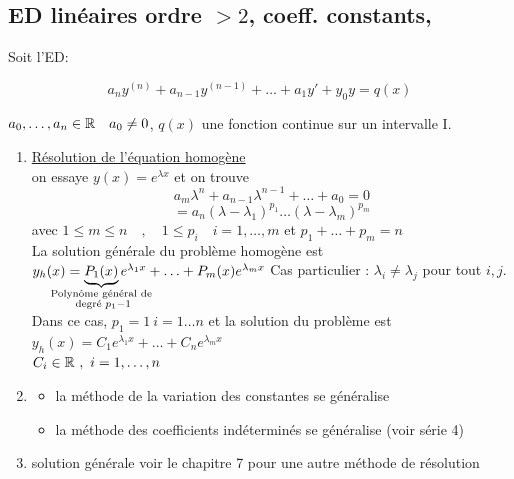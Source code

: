 \documentclass[12pt,a4paper]{article}
\begin{document}
\subsection{ED linéaires ordre $> 2$,  coeff. constants, }
Soit l'ED:
\begin{boite}[0.75]
	\begin{equation*}
		a_{n}y^{(n)}+a_{n-1}y^{(n-1)} + \ldots + a_1y' + y_0y = q(x)
	\end{equation*}
\end{boite}
$a_0,\ldots,a_n \in \mathbb{R} \quad a_0 \neq 0$, $q(x)$ une fonction continue sur un intervalle I.
\begin{enumerate}[label=\roman*)]
	\item \underline{Résolution de l'équation homogène}\\
		on essaye $y(x) = e^{\lambda x}$ et on trouve
		\begin{equation*}
		a_m\lambda^n + a_{n-1}\lambda^{n-1} + \ldots + a_0 = 0
		\end{equation*}
		\begin{equation*}
			= a_n(\lambda - \lambda_1)^{p_1} \ldots (\lambda-\lambda_m)^{p_m}
		\end{equation*}
		avec $1\leq m \leq n \quad , \quad 1\leq p_i \quad i=1,\ldots,m$ et $p_1+\ldots+p_m = n$\\
		La solution générale du problème homogène  est\\
		$y_h(x) = \underbrace{P_1(x)}_{\mathclap{\substack{\text{Polynôme général de}\\ \text{ degré }  p_1-1}}}e^{\lambda_1x} + \ldots + P_m(x)e^{\lambda_mx}$ %
		Cas particulier : $\lambda_i \neq \lambda_j$ pour tout $i,j$. Dans ce cas, $p_1=1 \ i = 1\ldots n$ et la solution du problème est \\
		$y_h(x) = C_1e^{\lambda_1x} + \ldots + C_ne^{\lambda_mx}$\\
		$C_i\in \mathbb{R} \ , \ i = 1,\ldots,n$
	\item  
		\begin{itemize}
			\item la méthode de la variation des constantes se généralise
			\item la méthode des coefficients indéterminés se généralise (voir série 4)
		\end{itemize}		 
	\item solution générale 
	voir le chapitre 7 pour une autre méthode de résolution
\end{enumerate}
\\
\end{document}
